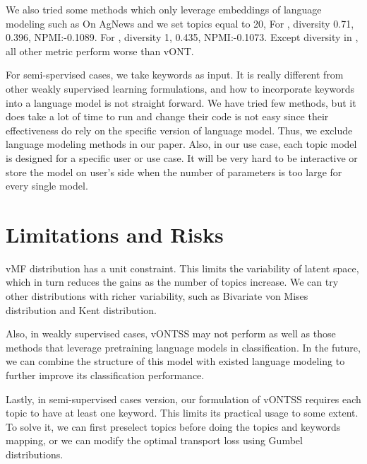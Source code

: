 \documentclass[11pt]{article}
\begin{document}
We also tried some methods which only leverage embeddings of language modeling such as 
On AgNews and we set topics equal to 20, For \cite{wang-etal-2020-neural-topic}, diversity 0.71,  0.396, NPMI:-0.1089. For \cite{Bianchi2021PretrainingIA}, diversity 1,  0.435, NPMI:-0.1073. Except diversity in \cite{Bianchi2021PretrainingIA}, all other metric perform worse than vONT. 

For semi-spervised cases, we take keywords as input. It is really different from other weakly supervised learning formulations, and how to incorporate keywords into a language model is not straight forward. We have tried few methods, but it does take a lot of time to run and change their code is not easy since their effectiveness do rely on the specific version of language model. Thus, we exclude language modeling methods in our paper. Also, in our use case, each topic model is designed for a specific user or use case. It will be very hard to be interactive or store the model on user's side when the number of parameters is too large for every single model.



 \section{Limitations and Risks}
vMF distribution has a unit constraint. This limits the variability of latent space, which in turn reduces the gains as the number of topics increase. We can try other distributions with richer variability, such as Bivariate von Mises distribution and Kent distribution.

Also, in weakly supervised cases, vONTSS may not perform as well as those methods that leverage pretraining language models in classification. In the future, we can combine the structure of this model with existed language modeling to further improve its classification performance.

Lastly, in semi-supervised cases version, our formulation of vONTSS requires each topic to have at least one keyword. This limits its practical usage to some extent. To solve it, we can first preselect topics before doing the topics and keywords mapping, or we can modify the optimal transport loss using Gumbel distributions. 
\end{document}
